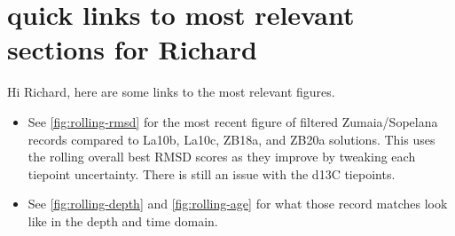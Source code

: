 \documentclass[draft]{agujournal2019}
\begin{document}
%
%
%
%





\section*{quick links to most relevant sections for Richard}
Hi Richard, here are some links to the most relevant figures.

\begin{itemize}
\item See \cref{fig:rolling-rmsd} for the most recent figure of filtered Zumaia/Sopelana records compared to La10b, La10c, ZB18a, and ZB20a solutions. This uses the rolling overall best \gls{RMSD} scores as they improve by tweaking each tiepoint uncertainty. There is still an issue with the \acrshort{d13C} tiepoints.
\item See \cref{fig:rolling-depth} and \cref{fig:rolling-age} for what those record matches look like in the depth and time domain.
\end{itemize}
\end{document}
